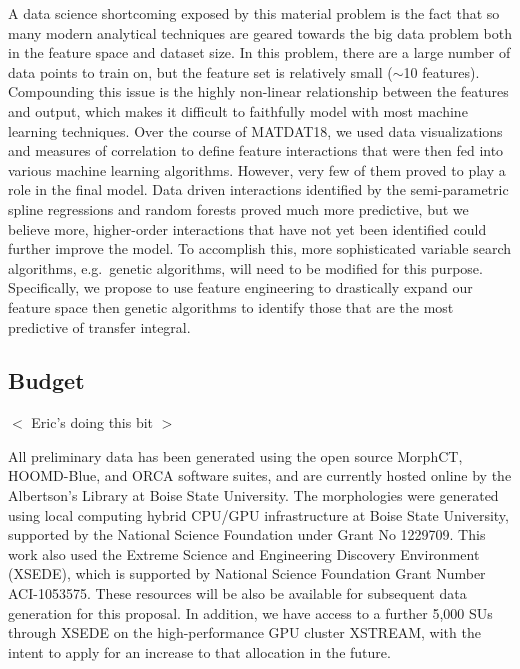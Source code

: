 \documentclass[12pt]{article}
\begin{document}
A data science shortcoming exposed by this material problem is the fact that so many modern analytical techniques are geared towards the big data problem both in the feature space and dataset size.
In this problem, there are a large number of data points to train on, but the feature set is relatively small ($\sim$10 features).
Compounding this issue is the highly non-linear relationship between the features and output, which makes it difficult to faithfully model with most machine learning techniques.
Over the course of MATDAT18, we used data visualizations and measures of correlation to define feature interactions that were then fed into various machine learning algorithms.
However, very few of them proved to play a role in the final model.
Data driven interactions identified by the semi-parametric spline regressions and random forests proved much more predictive, but we believe more, higher-order interactions that have not yet been identified could further improve the model.
To accomplish this, more sophisticated variable search algorithms, e.g.~genetic algorithms, will need to be modified for this purpose.
Specifically, we propose to use feature engineering to drastically expand our feature space then genetic algorithms to identify those that are the most predictive of transfer integral.


\subsection{Budget}

$<$ Eric's doing this bit $>$



All preliminary data has been generated using the open source MorphCT\cite{Jones2017}, HOOMD-Blue\cite{ANDERSON20085342}, and ORCA\cite{Neese2012b} software suites, and are currently hosted online by the Albertson's Library at Boise State University\cite{MatDat18Data}.
The morphologies were generated using local computing hybrid CPU/GPU infrastructure at Boise State University, supported by the National Science Foundation under Grant No 1229709.
This work also used the Extreme Science and Engineering Discovery Environment (XSEDE), which is supported by National Science Foundation Grant Number ACI-1053575.
These resources will be also be available for subsequent data generation for this proposal.
In addition, we have access to a further 5,000 SUs through XSEDE on the high-performance GPU cluster XSTREAM, with the intent to apply for an increase to that allocation in the future.

\newpage




\end{document}
